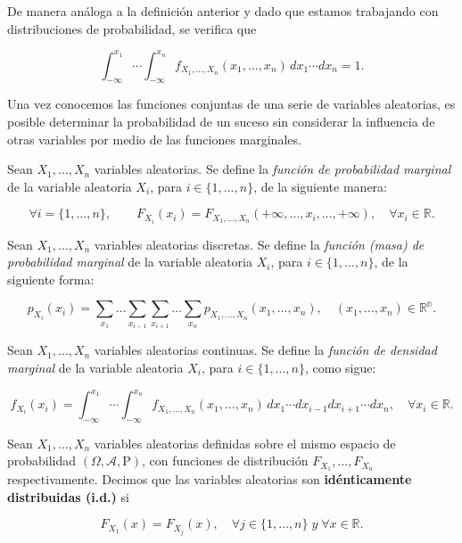 De manera análoga a la definición anterior y dado que estamos trabajando con distribuciones de probabilidad, se verifica que 

\[ \int_{-\infty}^{x_1} \cdots \int_{-\infty}^{x_n} f_{X_{1}, \ldots, X_n} (x_1, \ldots, x_n) \, dx_1 \cdots dx_n = 1. \]


Una vez conocemos las funciones conjuntas de una serie de variables aleatorias, es posible determinar la probabilidad de un suceso sin considerar la influencia de otras variables por medio de las funciones marginales.

\begin{definicion}
    Sean $X_1, \ldots, X_n$ variables aleatorias. Se define la \emph{función de probabilidad marginal} de la variable aleatoria $X_i$, para $i \in \{1, \ldots, n\}$, de la siguiente manera:

    \[ \forall i = \{1,\ldots,n\},  \qquad F_{X_i}(x_i) = F_{X_{1}, \ldots, X_{n}}(+\infty, \ldots,x_i, \ldots,+\infty), \quad \forall x_i \in \mathbb{R}. \]
\end{definicion}

\begin{definicion}
    Sean $X_1, \ldots, X_n$ variables aleatorias discretas. Se define la \emph{función (masa) de probabilidad marginal} de la variable aleatoria $X_i$, para $i \in \{1, \ldots, n\}$, de la siguiente forma:

    \[ p_{X_i}(x_i) = \sum_{x_1}\ldots\sum_{x_{i-1}}\sum_{x_{i+1}}\ldots\sum_{x_{n}} p_{X_1, \ldots, X_n}(x_1, \ldots, x_n), \quad (x_1, \ldots, x_n) \in \mathbb{R^n}. \]
\end{definicion}

\begin{definicion}
    Sean $X_1, \ldots, X_n$ variables aleatorias continuas. Se define la \emph{función de densidad marginal} de la variable aleatoria $X_i$, para $i \in \{1, \ldots, n\}$, como sigue:

    \[ f_{X_i}(x_i) = \int_{-\infty}^{x_1} \cdots \int_{-\infty}^{x_n} f_{X_{1}, \ldots, X_n} (x_1, \ldots, x_n) \, dx_1 \cdots dx_{i-1} dx_{i+1} \cdots  dx_n, \quad \forall x_i \in \mathbb{R}. \]
\end{definicion}

\begin{definicion}\label{def:variables-aleatorias-idénticamente-distribuidas}
    Sean $X_1, \ldots, X_n$ variables aleatorias definidas sobre el mismo espacio de probabilidad $(\Omega, \mathcal{A}, \mathrm{P})$, con funciones de distribución $F_{X_1}, \ldots, F_{X_n}$ respectivamente. Decimos que las variables aleatorias son \textbf{idénticamente distribuidas (i.d.)} si

    \[ F_{X_1}(x) = F_{X_j}(x), \quad \forall j \in \{1, \ldots, n \} \; y \; \forall x \in \mathbb{R}. \]
\end{definicion}

